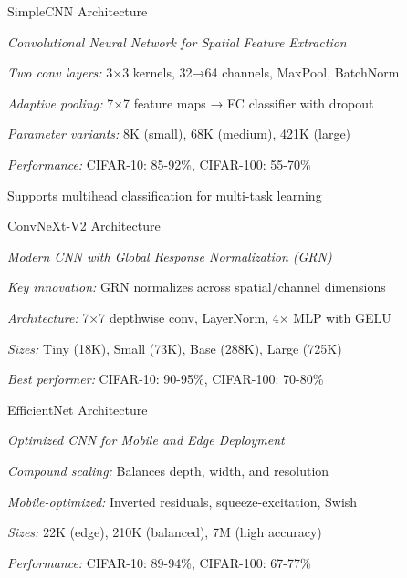 \begin{slide}[\slideopts,toc={CNN}]{SimpleCNN Architecture}
  
  \emph{Convolutional Neural Network for Spatial Feature Extraction}
  
  \begin{itemize}
    \mpitem \emph{Two conv layers:} 3×3 kernels, 32→64 channels, MaxPool, BatchNorm
    
    \mpitem \emph{Adaptive pooling:} 7×7 feature maps → FC classifier with dropout
    
    \mpitem \emph{Parameter variants:} 8K (small), 68K (medium), 421K (large)
    
    \mpitem \emph{Performance:} CIFAR-10: 85-92\%, CIFAR-100: 55-70\%
    
    \mpitem Supports multihead classification for multi-task learning
  \end{itemize}
\end{slide}

\begin{slide}[\slideopts,toc={ConvNeXt}]{ConvNeXt-V2 Architecture}
  
  \emph{Modern CNN with Global Response Normalization (GRN)}
  
  \begin{itemize}
    \mpitem \emph{Key innovation:} GRN normalizes across spatial/channel dimensions
    
    \mpitem \emph{Architecture:} 7×7 depthwise conv, LayerNorm, 4× MLP with GELU
    
    \mpitem \emph{Sizes:} Tiny (18K), Small (73K), Base (288K), Large (725K)
    
    \mpitem \emph{Best performer:} CIFAR-10: 90-95\%, CIFAR-100: 70-80\%
  \end{itemize}
\end{slide}

\begin{slide}[\slideopts,toc={EfficientNet}]{EfficientNet Architecture}
  
  \emph{Optimized CNN for Mobile and Edge Deployment}
  
  \begin{itemize}
    \mpitem \emph{Compound scaling:} Balances depth, width, and resolution
    
    \mpitem \emph{Mobile-optimized:} Inverted residuals, squeeze-excitation, Swish
    
    \mpitem \emph{Sizes:} 22K (edge), 210K (balanced), 7M (high accuracy)
    
    \mpitem \emph{Performance:} CIFAR-10: 89-94\%, CIFAR-100: 67-77\%
  \end{itemize}
\end{slide}

